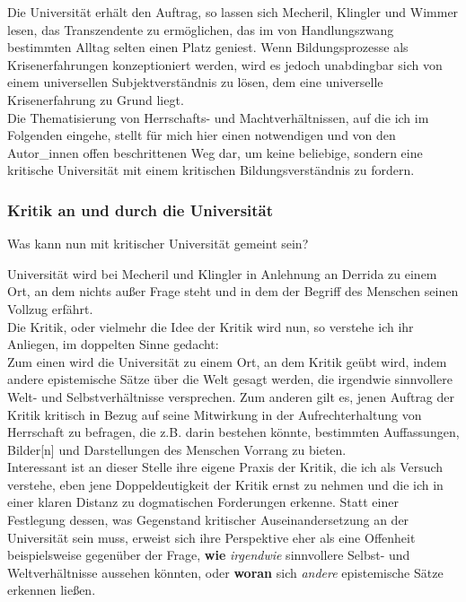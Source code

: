 \noindent Die Universität erhält den Auftrag, so lassen sich Mecheril, Klingler und
Wimmer lesen, das Transzendente zu ermöglichen, das im von Handlungszwang
bestimmten Alltag selten einen Platz geniest. Wenn Bildungsprozesse als
Krisenerfahrungen konzeptioniert werden, wird es jedoch unabdingbar sich von
einem universellen Subjektverständnis zu lösen, dem eine universelle
Krisenerfahrung zu Grund liegt.\\
Die Thematisierung von Herrschafts- und
Machtverhältnissen, auf die ich im Folgenden eingehe, stellt für mich hier
einen notwendigen und von den Autor\_innen offen beschrittenen Weg dar, um
keine beliebige, sondern eine kritische Universität mit einem kritischen
Bildungsverständnis zu fordern.

\subsubsection{Kritik an und durch die Universität}

Was kann nun mit kritischer Universität gemeint sein? 

\noindent Universität wird bei
Mecheril und Klingler in Anlehnung an Derrida\footnotemark{} zu einem Ort, an dem nichts
außer Frage steht und in dem der \glqq Begriff des Menschen seinen Vollzug
erfährt.\grqq\footnotemark {}\\
Die Kritik, oder vielmehr die Idee der Kritik wird nun, so verstehe
ich ihr Anliegen, im doppelten Sinne gedacht:\\ 
Zum einen wird die Universität zu
einem Ort, an dem Kritik geübt wird, indem \glqq andere epistemische Sätze\grqq \footnotemark {} über
die Welt gesagt werden, die \glqq irgendwie sinnvollere Welt- und
Selbstverhältnisse\grqq\footnotemark {} versprechen. 
Zum anderen gilt es, jenen Auftrag der Kritik
kritisch in Bezug auf seine Mitwirkung in der Aufrechterhaltung von Herrschaft
zu befragen, die z.B. darin bestehen könnte, bestimmten \glqq Auffassungen,
Bilder[n] und Darstellungen des Menschen\grqq\footnotemark
{} Vorrang zu bieten.\\
Interessant ist an dieser Stelle ihre eigene Praxis der Kritik, die ich als Versuch verstehe,
eben jene Doppeldeutigkeit der Kritik ernst zu nehmen und die ich in einer
klaren Distanz zu dogmatischen Forderungen erkenne. Statt einer Festlegung
dessen, was Gegenstand kritischer Auseinandersetzung an der Universität sein
muss, erweist sich ihre Perspektive eher als eine Offenheit beispielsweise
gegenüber der Frage, \textbf{wie} \textit{irgendwie} sinnvollere Selbst- und Weltverhältnisse
aussehen könnten, oder \textbf{woran} sich \textit{andere} epistemische Sätze erkennen ließen.\\


